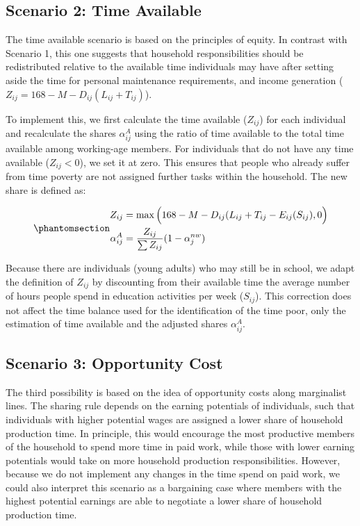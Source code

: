 \documentclass[
  11pt,
]{article}
\begin{document}
\subsection{Scenario 2: Time Available}\label{scenario-2-time-available}

The time available scenario is based on the principles of equity. In
contrast with Scenario 1, this one suggests that household
responsibilities should be redistributed relative to the available time
individuals may have after setting aside the time for personal
maintenance requirements, and income generation
(\(Z_{ij}=168-M-D_{ij}(L_{ij}+T_{ij})\)).

To implement this, we first calculate the time available (\(Z_{ij}\))
for each individual and recalculate the shares \(\alpha_{ij}^A\) using
the ratio of time available to the total time available among
working-age members. For individuals that do not have any time available
(\(Z_{ij}<0\)), we set it at zero. This ensures that people who already
suffer from time poverty are not assigned further tasks within the
household. The new share is defined as:

\begin{equation}\phantomsection\label{eq-r2}{
\begin{aligned}
Z_{ij} &=\max{\Big(168-M-D_{ij}(L_{ij}+T_{ij}-E_{ij}(S_{ij}),0\Big)} \\
\alpha_{ij}^A &= \frac{Z_{ij}}{\sum Z_{ij}} (1-\alpha_{j}^{nw})
\end{aligned}
}\end{equation}

Because there are individuals (young adults) who may still be in school,
we adapt the definition of \(Z_{ij}\) by discounting from their
available time the average number of hours people spend in education
activities per week (\(S_{ij}\)). This correction does not affect the
time balance used for the identification of the time poor, only the
estimation of time available and the adjusted shares \(\alpha_{ij}^A\).

\subsection{Scenario 3: Opportunity
Cost}\label{scenario-3-opportunity-cost}

The third possibility is based on the idea of opportunity costs along
marginalist lines. The sharing rule depends on the earning potentials of
individuals, such that individuals with higher potential wages are
assigned a lower share of household production time. In principle, this
would encourage the most productive members of the household to spend
more time in paid work, while those with lower earning potentials would
take on more household production responsibilities. However, because we
do not implement any changes in the time spend on paid work, we could
also interpret this scenario as a bargaining case where members with the
highest potential earnings are able to negotiate a lower share of
household production time.
\end{document}
